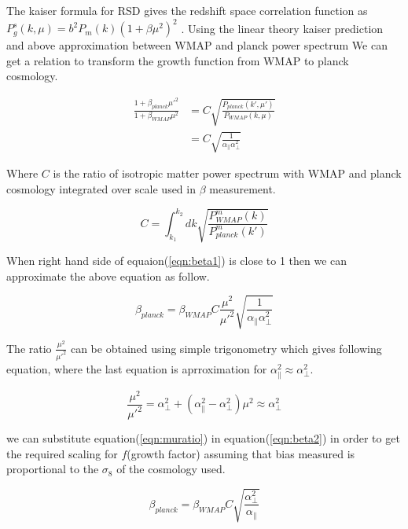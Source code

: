 The kaiser formula for RSD gives the redshift space correlation function as $P_g^s(k,\mu) = b^2 P_m(k) (1 + \beta \mu^2)^2$ \cite{kaiser}. Using the linear theory kaiser prediction and above approximation between WMAP and planck power spectrum We can get a relation to transform the growth function from WMAP to planck cosmology.

\begin{align}
\frac{1+\beta_{planck} \mu'^2}{1+\beta_{WMAP} \mu^2} &= C \sqrt{\frac{P_{planck}(k',\mu')}{P_{WMAP}(k,\mu)}} \\
          &= C \sqrt{\frac{1}{\alpha_\parallel \alpha_\perp^2}} 
\label{eqn:beta1}
\end{align}

Where $C$ is the ratio of isotropic matter power spectrum with WMAP and planck cosmology  integrated over scale used in $\beta$ measurement.

\begin{equation}
C = \int_{k_1}^{k_2} dk \sqrt{\frac{P_{WMAP}^{m}(k)}{P_{planck}^{m}(k')}} 
\end{equation}

When right hand side of equaion(\ref{eqn:beta1}) is close to 1 then we can approximate the above equation as follow.

\begin{equation}
\beta_{planck} = \beta_{WMAP} C \frac{\mu^2}{\mu'^2} \sqrt{\frac{1}{\alpha_\parallel \alpha_\perp^2}} 
\label{eqn:beta2}
\end{equation}

The ratio $\frac{\mu^2}{\mu'^2}$ can be obtained using simple trigonometry which gives following equation, where the last equation is aprroximation for $\alpha_\parallel^2 \approx \alpha_\perp^2$.

\begin{equation}
\frac{\mu^2}{\mu'^2} =\alpha_\perp^2 +(\alpha_\parallel^2 -\alpha_\perp^2) \mu^2 \approx \alpha_\perp^2
\label{eqn:muratio}
\end{equation}

we can substitute equation(\ref{eqn:muratio}) in equation(\ref{eqn:beta2}) in order to get the required scaling for $f$(growth factor) assuming that bias measured is proportional to the $\sigma_8$ of the cosmology used.

\begin{equation}
\beta_{planck}=\beta_{WMAP} C \sqrt{\frac{\alpha_\perp^2}{\alpha_\parallel} }
\end{equation}

